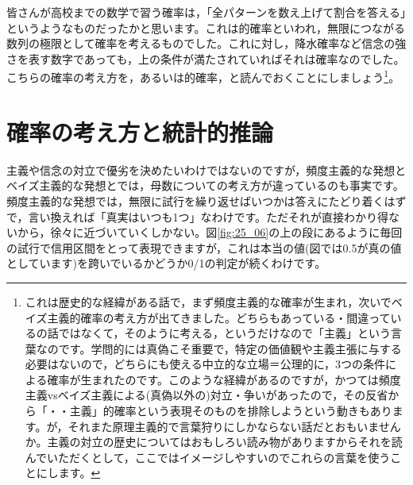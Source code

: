 \documentclass{ltjsarticle}
\begin{document}
皆さんが高校までの数学で習う確率は，「全パターンを数え上げて割合を答える」というようなものだったかと思います。これは的確率といわれ，無限につながる数列の極限として確率を考えるものでした。これに対し，降水確率など信念の強さを表す数字であっても，上の条件が満たされていればそれは確率なのでした。こちらの確率の考え方を，あるいは的確率，と読んでおくことにしましょう\footnote{これは歴史的な経緯がある話で，まず頻度主義的な確率が生まれ，次いでベイズ主義的確率の考え方が出てきました。どちらもあっている・間違っているの話ではなくて，そのように考える，というだけなので「主義」という言葉なのです。学問的には真偽こそ重要で，特定の価値観や主義主張に与する必要はないので，どちらにも使える中立的な立場＝公理的に，3つの条件による確率が生まれたのです。このような経緯があるのですが，かつては頻度主義vsベイズ主義による(真偽以外の)対立・争いがあったので，その反省から「・・主義」的確率という表現そのものを排除しようという動きもあります。が，それまた原理主義的で言葉狩りにしかならない話だとおもいませんか。主義の対立の歴史についてはおもしろい読み物がありますからそれ\parencite{mcgrayne2011theory}を読んでいただくとして，ここではイメージしやすいのでこれらの言葉を使うことにします。}。


\section{確率の考え方と統計的推論}


主義や信念の対立で優劣を決めたいわけではないのですが，頻度主義的な発想とベイズ主義的な発想とでは，母数についての考え方が違っているのも事実です。頻度主義的な発想では，無限に試行を繰り返せばいつかは答えにたどり着くはずで，言い換えれば「真実はいつも1つ」なわけです。ただそれが直接わかり得ないから，徐々に近づいていくしかない。図\ref{fig:25_06}の上の段にあるように毎回の試行で信用区間をとって表現できますが，これは本当の値(図では0.5が真の値としています)を跨いでいるかどうか0/1の判定が続くわけです。
\end{document}
